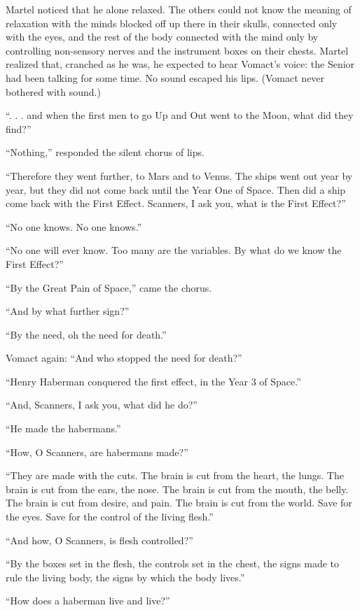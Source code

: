 Martel noticed that he alone relaxed. The others could not know the meaning of relaxation with the minds blocked off up there in their skulls, connected only with the eyes, and the rest of the body connected with the mind only by controlling non-sensory nerves and the instrument boxes on their chests. Martel realized that, cranched as he was, he expected to hear Vomact's voice: the Senior had been talking for some time. No sound escaped his lips. (Vomact never bothered with sound.)

``. . . and when the first men to go Up and Out went to the Moon, what did they find?''

``Nothing,'' responded the silent chorus of lips.

``Therefore they went further, to Mars and to Venus. The ships went out year by year, but they did not come back until the Year One of Space. Then did a ship come back with the First Effect. Scanners, I ask you, what is the First Effect?''

``No one knows. No one knows.''

``No one will ever know. Too many are the variables. By what do we know the First Effect?''

``By the Great Pain of Space,'' came the chorus.

``And by what further sign?''

``By the need, oh the need for death.''

Vomact again: ``And who stopped the need for death?''

``Henry Haberman conquered the first effect, in the Year 3 of Space.''

``And, Scanners, I ask you, what did he do?''

``He made the habermans.''

``How, O Scanners, are habermans made?''

``They are made with the cuts. The brain is cut from the heart, the lungs. The brain is cut from the ears, the nose. The brain is cut from the mouth, the belly. The brain is cut from desire, and pain. The brain is cut from the world. Save for the eyes. Save for the control of the living flesh.''

``And how, O Scanners, is flesh controlled?''

``By the boxes set in the flesh, the controls set in the chest, the signs made to rule the living body, the signs by which the body lives.''

``How does a haberman live and live?''

